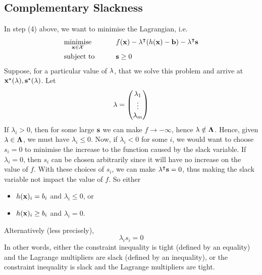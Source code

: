 \subsection{Complementary Slackness}
In step (4) above, we want to minimise the Lagrangian, i.e.
\begin{alignat*}{2}
	 & \underset{\vb x \in \mathcal X}{\text{minimise}} & \qquad & f(\vb x) - \vb \lambda^\intercal (h(\vb x) - \vb b) - \vb \lambda^\intercal \vb s \\
	 & \text{subject to}                                &        & \vb s \geq 0
\end{alignat*}
Suppose, for a particular value of \(\vb \lambda\), that we solve this problem and arrive at \(\vb x^\star(\vb \lambda), \vb s^\star(\vb \lambda)\).
Let
\[
	\vb \lambda = \begin{pmatrix}
		\lambda_1 \\ \vdots \\ \lambda_m
	\end{pmatrix}
\]
If \(\lambda_i > 0\), then for some large \(\vb s\) we can make \(f \to -\infty\), hence \(\vb \lambda \notin \vb \Lambda\).
Hence, given \(\vb \lambda \in \vb \Lambda\), we must have \(\lambda_i \leq 0\).
Now, if \(\lambda_i < 0\) for some \(i\), we would want to choose \(s_i = 0\) to minimise the increase to the function caused by the slack variable.
If \(\lambda_i = 0\), then \(s_i\) can be chosen arbitrarily since it will have no increase on the value of \(f\).
With these choices of \(s_i\), we can make \(\vb \lambda^\intercal \vb s = 0\), thus making the slack variable not impact the value of \(f\).
So either
\begin{itemize}
	\item \(h(\vb x)_i = b_i\) and \(\lambda_i \leq 0\), or
	\item \(h(\vb x)_i \geq b_i\) and \(\lambda_i = 0\).
\end{itemize}
Alternatively (less precisely),
\[
	\lambda_i s_i = 0
\]
In other words, either the constraint inequality is tight (defined by an equality) and the Lagrange multipliers are slack (defined by an inequality), or the constraint inequality is slack and the Lagrange multipliers are tight.

